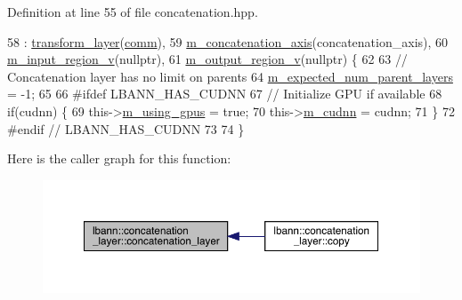 Definition at line 55 of file concatenation.\+hpp.


\begin{DoxyCode}
58     : \hyperlink{classlbann_1_1transform__layer_a4b72501e0f4d0745c8b13c5331055e65}{transform\_layer}(\hyperlink{file__io_8cpp_ab048c6f9fcbcfaa57ce68b00263dbebe}{comm}),
59       \hyperlink{classlbann_1_1concatenation__layer_a4ac4a931dc85d622e9ea8fddb9625d38}{m\_concatenation\_axis}(concatenation\_axis),
60       \hyperlink{classlbann_1_1concatenation__layer_afa68f2e5d3ea2de57f4974a37c01fc7b}{m\_input\_region\_v}(\textcolor{keyword}{nullptr}),
61       \hyperlink{classlbann_1_1concatenation__layer_af141bf9cf1569121a65a68e4ae97855c}{m\_output\_region\_v}(\textcolor{keyword}{nullptr}) \{
62 
63     \textcolor{comment}{// Concatenation layer has no limit on parents}
64     \hyperlink{classlbann_1_1Layer_a841b96b25555247f52921c7f13ae1dfa}{m\_expected\_num\_parent\_layers} = -1;
65 
66 \textcolor{preprocessor}{  #ifdef LBANN\_HAS\_CUDNN}
67     \textcolor{comment}{// Initialize GPU if available}
68     \textcolor{keywordflow}{if}(cudnn) \{
69       this->\hyperlink{classlbann_1_1Layer_af7881cb5eff5207c15fa835d65462e8f}{m\_using\_gpus} = \textcolor{keyword}{true};
70       this->\hyperlink{classlbann_1_1Layer_a08dbb94239e3b8c96329786c57c72e21}{m\_cudnn} = cudnn;
71     \}
72 \textcolor{preprocessor}{  #endif // LBANN\_HAS\_CUDNN}
73 
74   \}
\end{DoxyCode}
Here is the caller graph for this function\+:\nopagebreak
\begin{figure}[H]
\begin{center}
\leavevmode
\includegraphics[width=350pt]{classlbann_1_1concatenation__layer_ab826328d5224933dfc90e246d16de50e_icgraph}
\end{center}
\end{figure}
\mbox{\label{classlbann_1_1concatenation__layer_a0498925fcb0a42f1bc8fd1913b9090fc}} 
